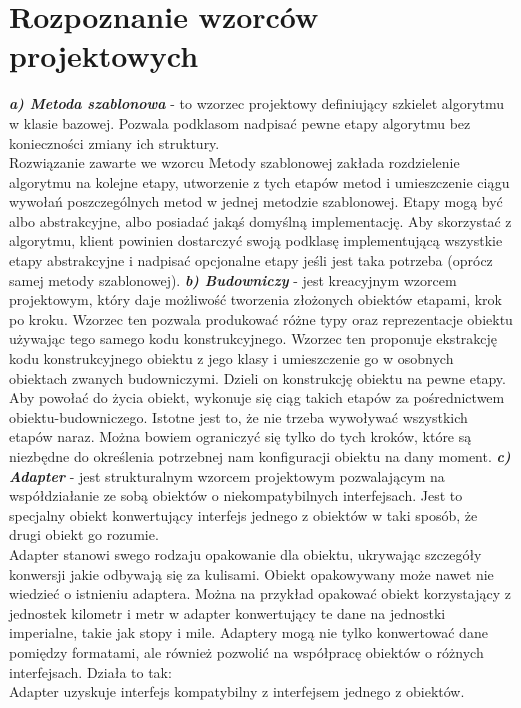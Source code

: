 	\newpage
\section{Rozpoznanie wzorców projektowych}		%
\textbf{\textit{a) Metoda szablonowa}} - to wzorzec projektowy definiujący szkielet algorytmu w klasie bazowej. Pozwala podklasom nadpisać pewne etapy algorytmu bez konieczności zmiany ich struktury.
\\Rozwiązanie zawarte we wzorcu Metody szablonowej zakłada rozdzielenie algorytmu na kolejne etapy, utworzenie z tych etapów metod i umieszczenie ciągu wywołań poszczególnych metod w jednej metodzie szablonowej. Etapy mogą być albo abstrakcyjne, albo posiadać jakąś domyślną implementację. Aby skorzystać z algorytmu, klient powinien dostarczyć swoją podklasę implementującą wszystkie etapy abstrakcyjne i nadpisać opcjonalne etapy jeśli jest taka potrzeba (oprócz samej metody szablonowej).
\newline\textbf{\textit{b) Budowniczy}} - jest kreacyjnym wzorcem projektowym, który daje możliwość tworzenia złożonych obiektów etapami, krok po kroku. Wzorzec ten pozwala produkować różne typy oraz reprezentacje obiektu używając tego samego kodu konstrukcyjnego. Wzorzec ten proponuje ekstrakcję kodu konstrukcyjnego obiektu z jego klasy i umieszczenie go w osobnych obiektach zwanych budowniczymi. Dzieli on konstrukcję obiektu na pewne etapy. Aby powołać do życia obiekt, wykonuje się ciąg takich etapów za pośrednictwem obiektu-budowniczego. Istotne jest to, że nie trzeba wywoływać wszystkich etapów naraz. Można bowiem ograniczyć się tylko do tych kroków, które są niezbędne do określenia potrzebnej nam konfiguracji obiektu na dany moment.
\newline\textbf{\textit{c) Adapter}} - jest strukturalnym wzorcem projektowym pozwalającym na współdziałanie ze sobą obiektów o niekompatybilnych interfejsach. Jest to specjalny obiekt konwertujący interfejs jednego z obiektów w taki sposób, że drugi obiekt go rozumie.
\\Adapter stanowi swego rodzaju opakowanie dla obiektu, ukrywając szczegóły konwersji jakie odbywają się za kulisami. Obiekt opakowywany może nawet nie wiedzieć o istnieniu adaptera. Można na przykład opakować obiekt korzystający z jednostek kilometr i metr w adapter konwertujący te dane na jednostki imperialne, takie jak stopy i mile.
Adaptery mogą nie tylko konwertować dane pomiędzy formatami, ale również pozwolić na współpracę obiektów o różnych interfejsach. Działa to tak:
\\Adapter uzyskuje interfejs kompatybilny z interfejsem jednego z obiektów.
